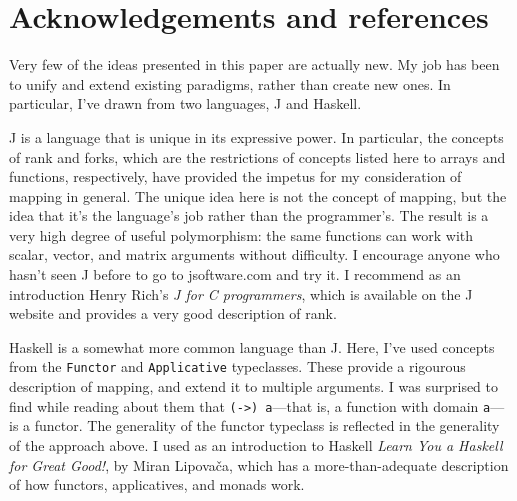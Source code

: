 \documentclass{article}
\newcommand{\code}[1]{\lstinline`#1`}
\begin{document}
\section{Acknowledgements and references}
Very few of the ideas presented in this paper are actually new. My job has been to unify and extend existing paradigms, rather than create new ones. In particular, I've drawn from two languages, J and Haskell.

J is a language that is unique in its expressive power. In particular, the concepts of rank and forks, which are the restrictions of concepts listed here to arrays and functions, respectively, have provided the impetus for my consideration of mapping in general. The unique idea here is not the concept of mapping, but the idea that it's the language's job rather than the programmer's. The result is a very high degree of useful polymorphism: the same functions can work with scalar, vector, and matrix arguments without difficulty. I encourage anyone who hasn't seen J before to go to jsoftware.com and try it. I recommend as an introduction Henry Rich's \textit{J for C programmers}, which is available on the J website and provides a very good description of rank.

Haskell is a somewhat more common language than J. Here, I've used concepts from the \code{Functor} and \code{Applicative} typeclasses. These provide a rigourous description of mapping, and extend it to multiple arguments. I was surprised to find while reading about them that \code{(->) a}---that is, a function with domain \code{a}---is a functor. The generality of the functor typeclass is reflected in the generality of the approach above. I used as an introduction to Haskell \textit{Learn You a Haskell for Great Good!}, by Miran Lipova\v{c}a, which has a more-than-adequate description of how functors, applicatives, and monads work.
\end{document}
